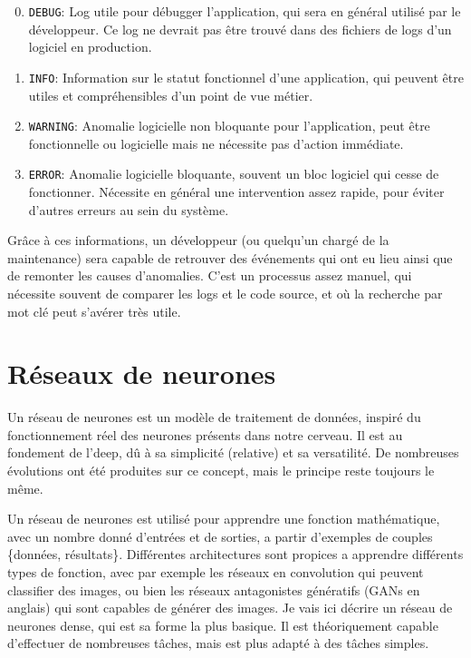 \documentclass[openany, 11pt]{memoir}
\begin{document}
\begin{enumerate}
	\setcounter{enumi}{-1}
	\item \texttt{DEBUG}: Log utile pour débugger l'application, qui sera en général utilisé par le développeur. Ce log ne devrait pas être trouvé dans des fichiers de logs d'un logiciel en production.
	\item \texttt{INFO}: Information sur le statut fonctionnel d'une application, qui peuvent être utiles et compréhensibles d'un point de vue métier.
	\item \texttt{WARNING}: Anomalie logicielle non bloquante pour l'application, peut être fonctionnelle ou logicielle mais ne nécessite pas d'action immédiate.
	\item \texttt{ERROR}: Anomalie logicielle bloquante, souvent un bloc logiciel qui cesse de fonctionner. Nécessite en général une intervention assez rapide, pour éviter d'autres erreurs au sein du système.
\end{enumerate}

Grâce à ces informations, un développeur (ou quelqu'un chargé de la maintenance) sera capable de retrouver des événements qui ont eu lieu ainsi que de remonter les causes d'anomalies. C'est un processus assez manuel, qui nécessite souvent de comparer les logs et le code source, et où la recherche par mot clé peut s'avérer très utile.

\section{Réseaux de neurones}

Un réseau de neurones est un modèle de traitement de données, inspiré du fonctionnement réel des neurones présents dans notre cerveau. Il est au fondement de l'\gls{deep}, dû à sa simplicité (relative) et sa versatilité. De nombreuses évolutions ont été produites sur ce concept, mais le principe reste toujours le même.

Un réseau de neurones est utilisé pour apprendre une fonction mathématique, avec un nombre donné d'entrées et de sorties, a partir d'exemples de couples \{données, résultats\}. Différentes architectures sont propices a apprendre différents types de fonction, avec par exemple les réseaux en convolution qui peuvent classifier des images, ou bien les réseaux antagonistes génératifs (GANs en anglais) qui sont capables de générer des images. Je vais ici décrire un réseau de neurones dense, qui est sa forme la plus basique. Il est théoriquement capable d'effectuer de nombreuses tâches, mais est plus adapté à des tâches simples.
\end{document}
